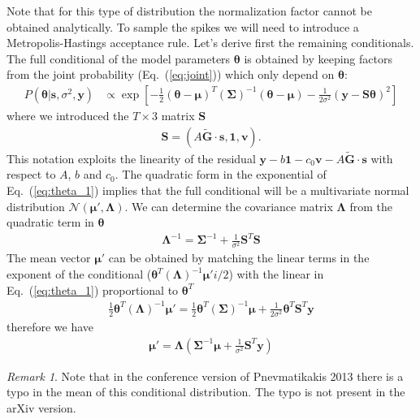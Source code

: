 \documentclass{article}
\theoremstyle{remark}
\newtheorem{remark}{Remark}
\begin{document}
Note that for this type of distribution the normalization factor cannot be obtained analytically. To sample the spikes we will need to introduce a Metropolis-Hastings acceptance rule. Let's derive first the remaining conditionals. The full conditional of the model parameters $\bm{\theta}$ is obtained by keeping factors from the joint probability (Eq.~(\ref{eq:joint})) which only depend on $\bm{\theta}$:
\begin{align}
    P(\bm{\theta} | \bm{s},\sigma^2,\bm{y}) &\propto \exp\left[-\frac{1}{2} (\bm{\theta}-\bm{\mu})^T(\bm\Sigma)^{-1}(\bm\theta-\bm\mu)-\frac{1}{2\sigma^2}(\bm y-\bm S \bm\theta)^2\right] \label{eq:theta_1}
\end{align}
where we introduced the $T\times3$ matrix $\bm S$ 
\begin{align}
    \bm S = (A\bm{\tilde G}\cdot\bm{s},\bm{1},\bm v).
\end{align}
This notation exploits the linearity of the residual $\bm{y}-b\bm{1} - c_0 \bm{v}-A\bm{\tilde G}\cdot \bm{s}$ with respect to $A$, $b$ and $c_0$.
The quadratic form in the exponential of Eq.~(\ref{eq:theta_1}) implies that the full conditional will be a multivariate normal distribution $\mathcal{N}(\bm\mu',\bm\Lambda)$. We can determine the covariance matrix $\bm\Lambda$ from the quadratic term in $\bm\theta$
\begin{align}
    \bm{\Lambda}^{-1} = \bm{\Sigma}^{-1}+\frac{1}{\sigma^2}\bm{S}^T \bm{S}
\end{align}
The mean vector $\bm\mu'$ can be obtained by matching the linear terms in the exponent of the conditional ($\bm\theta^T(\bm\Lambda)^{-1}\bm\mu'i/2$) with the linear in Eq.~(\ref{eq:theta_1}) proportional to $\bm\theta^T$
\begin{align}
    \frac{1}{2}\bm\theta^T(\bm\Lambda)^{-1}\bm\mu' = \frac{1}{2}\bm\theta^T(\bm\Sigma)^{-1}\bm\mu+\frac{1}{2\sigma^2}\bm{\theta}^T\bm{S}^T\bm{y}
\end{align}
therefore we have
\begin{align}
    \bm\mu'=\bm\Lambda\left(\bm\Sigma^{-1}\bm\mu+\frac{1}{\sigma^2}\bm{S}^T\bm{y}\right)
\end{align}
\begin{tcolorbox}
    \begin{remark}
    Note that in the conference version of Pnevmatikakis 2013 there is a typo in the mean of this conditional distribution. The typo is not present in the arXiv version.
    \end{remark}
\end{tcolorbox}
\end{document}
